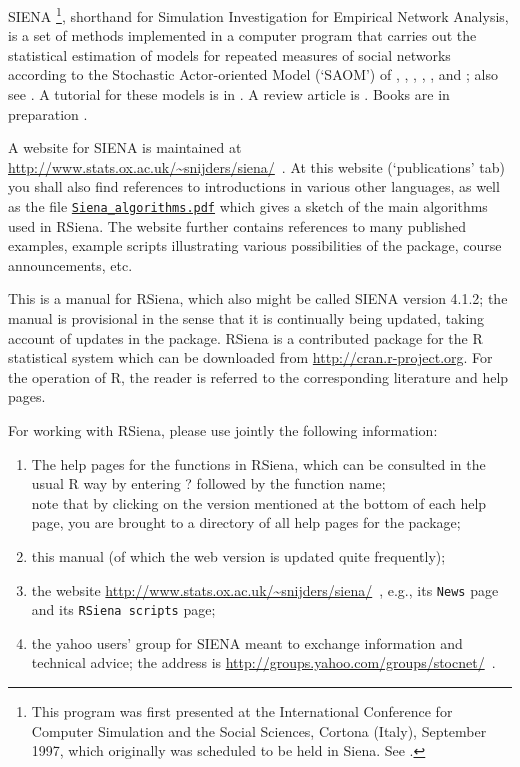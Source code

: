 \documentclass[a4paper,fleqn,11pt]{article}
\newcommand{\+}{\, + \,}
\newcommand{\R}{{\sf R }}
\newcommand{\Rn}{{\sf R}}
\newcommand{\rs}{{\sf RSiena}}
\newcommand{\RS}{{\sf RSiena }}
\newcommand{\SI}{{\sf SIENA }}
\newcommand{\si}{{\sf SIENA}}
\begin{document}
\si
\footnote{This program was first presented at the
International Conference for Computer Simulation and the Social
Sciences, Cortona (Italy), September 1997, which originally was
scheduled to be held in Siena. See \citet{SnijdersDuijn97}.},
shorthand for {\sf Simulation Investigation for Empirical
Network Analysis}, is a set of methods
implemented in a computer program that carries out the
statistical estimation of models for repeated measures of social
networks according to the Stochastic Actor-oriented Model
 (`SAOM') of \citet{SnijdersDuijn97}, \citet{Snijders01},
\citet{SnijdersEA07},  \citet{SnijdersEA10a}, \citet{SLT2013},
and \citet{Greenan15}; also see \citet{SteglichEA10}.
A tutorial for these models is in \citet{SnijdersEA10b}.
A review article is \citet{Snijders2017}.
Books are in preparation \citep{AMAND,SNDE}.

A website for \SI is maintained at
{\small\url{http://www.stats.ox.ac.uk/~snijders/siena/}~}.
At this website (`publications' tab)
you shall also find references to introductions in various other languages,
as well as the file
\href{http://www.stats.ox.ac.uk/~snijders/siena/Siena_algorithms.pdf}{\texttt{Siena\_algorithms.pdf}}
 which
gives a sketch of the main algorithms used in \rs.
The website further contains references to many published examples,
example scripts illustrating various possibilities of the package,
course announcements, etc.

This is a manual for \rs, which also might be called \SI version 4.1.2;
the manual is provisional in the sense
that it is continually being updated, taking account of
updates in the package.
\RS is a contributed package for the \R statistical system \citep{R}
which can be downloaded from
\url{http://cran.r-project.org}. For the operation of \Rn,
the reader is referred to the corresponding literature and help pages.

For working with \rs, please use jointly the following
information:
\begin{enumerate}
  \item The help pages for the functions in \rs, which can be consulted
        in the usual \R way by entering ? followed by the function name;\\
        note that by clicking on the version mentioned at the bottom
        of each help page, you are brought to a directory of all help
        pages for the package;
  \item this manual (of which the web version is updated quite frequently);
  \item the website
{\small\url{http://www.stats.ox.ac.uk/~snijders/siena/}~},
        e.g., its \texttt{News} page and its \texttt{RSiena scripts} page;
  \item the yahoo users' group for \SI meant to exchange information
        and technical advice; the address is
        {\small\url{http://groups.yahoo.com/groups/stocnet/}~}.
\end{enumerate}
\end{document}
